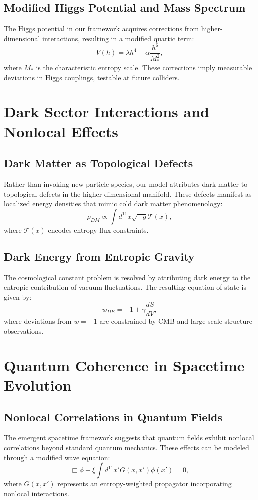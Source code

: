 \documentclass{article}
\begin{document}
\subsection{Modified Higgs Potential and Mass Spectrum}
The Higgs potential in our framework acquires corrections from higher-dimensional interactions, resulting in a modified quartic term:
\begin{equation}
V(h) = \lambda h^4 + \alpha \frac{h^6}{M_*^2},
\end{equation}
where $M_*$ is the characteristic entropy scale. These corrections imply measurable deviations in Higgs couplings, testable at future colliders.

\section{Dark Sector Interactions and Nonlocal Effects}

\subsection{Dark Matter as Topological Defects}
Rather than invoking new particle species, our model attributes dark matter to topological defects in the higher-dimensional manifold. These defects manifest as localized energy densities that mimic cold dark matter phenomenology:
\begin{equation}
\rho_{DM} \propto \int d^{11}x \sqrt{-g} \mathcal{T}(x),
\end{equation}
where $\mathcal{T}(x)$ encodes entropy flux constraints.

\subsection{Dark Energy from Entropic Gravity}
The cosmological constant problem is resolved by attributing dark energy to the entropic contribution of vacuum fluctuations. The resulting equation of state is given by:
\begin{equation}
w_{DE} = -1 + \gamma \frac{dS}{dV},
\end{equation}
where deviations from $w = -1$ are constrained by CMB and large-scale structure observations.

\section{Quantum Coherence in Spacetime Evolution}

\subsection{Nonlocal Correlations in Quantum Fields}
The emergent spacetime framework suggests that quantum fields exhibit nonlocal correlations beyond standard quantum mechanics. These effects can be modeled through a modified wave equation:
\begin{equation}
\Box \phi + \xi \int d^{11}x' G(x, x') \phi(x') = 0,
\end{equation}
where $G(x, x')$ represents an entropy-weighted propagator incorporating nonlocal interactions.
\end{document}
